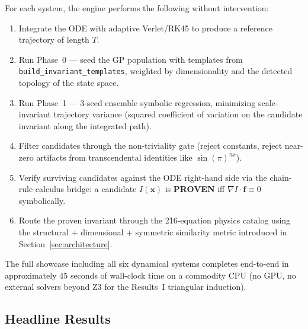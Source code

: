 For each system, the engine performs the following without intervention:
\begin{enumerate}
  \item Integrate the ODE with adaptive Verlet/RK45 to produce a reference
        trajectory of length $T$.
  \item Run Phase~0 --- seed the GP population with templates from
        \texttt{build\_invariant\_templates}, weighted by dimensionality
        and the detected topology of the state space.
  \item Run Phase~1 --- 3-seed ensemble symbolic regression, minimizing
        scale-invariant trajectory variance (squared coefficient of
        variation on the candidate invariant along the integrated path).
  \item Filter candidates through the non-triviality gate (reject constants,
        reject near-zero artifacts from transcendental identities like
        $\sin(\pi)^{\pi x}$).
  \item Verify surviving candidates against the ODE right-hand side via
        the chain-rule calculus bridge: a candidate $I(\mathbf{x})$ is
        \textbf{PROVEN} iff $\nabla I \cdot \mathbf{f} \equiv 0$ symbolically.
  \item Route the proven invariant through the 216-equation physics catalog
        using the structural + dimensional + symmetric similarity metric
        introduced in Section~\ref{sec:architecture}.
\end{enumerate}

The full showcase including all six dynamical systems completes end-to-end
in approximately $45$ seconds of wall-clock time on a commodity CPU (no
GPU, no external solvers beyond Z3 for the Results~I triangular induction).

\subsection{Headline Results}

%
%

